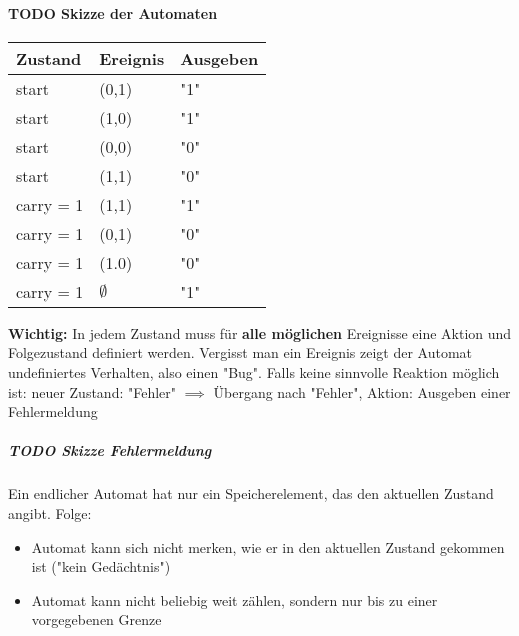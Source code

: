 \documentclass[a4paper]{scrartcl}
\theoremstyle{definition}
\theoremstyle{plain}
\theoremstyle{remark}
\theoremstyle{remark}
\begin{document}
\paragraph{{\bfseries\sffamily TODO} Skizze der Automaten}
\label{sec-3-3-3-2}
\begin{center}
\begin{tabular}{lll}
Zustand & Ereignis & Ausgeben\\
\hline
start & (0,1) & "1"\\
start & (1,0) & "1"\\
start & (0,0) & "0"\\
start & (1,1) & "0"\\
carry = 1 & (1,1) & "1"\\
carry = 1 & (0,1) & "0"\\
carry = 1 & (1.0) & "0"\\
carry = 1 & $\emptyset$ & "1"\\
\end{tabular}
\end{center}
\textbf{Wichtig:} In jedem Zustand muss für \textbf{alle möglichen} Ereignisse eine Aktion und Folgezustand definiert werden.
Vergisst man ein Ereignis zeigt der Automat undefiniertes Verhalten, also einen "Bug".
Falls keine sinnvolle Reaktion möglich ist: neuer Zustand: "Fehler" $\implies$ Übergang nach "Fehler",
Aktion: Ausgeben einer Fehlermeldung
\subparagraph{{\bfseries\sffamily TODO} Skizze Fehlermeldung}
\label{sec-3-3-3-2-1}
Ein endlicher Automat hat nur ein Speicherelement, das den aktuellen Zustand angibt. Folge:
\begin{itemize}
\item Automat kann sich nicht merken, wie er in den aktuellen Zustand gekommen ist ("kein Gedächtnis")
\item Automat kann nicht beliebig weit zählen, sondern nur bis zu einer vorgegebenen Grenze
\end{itemize}
\begin{center}
\end{center}
\end{document}
